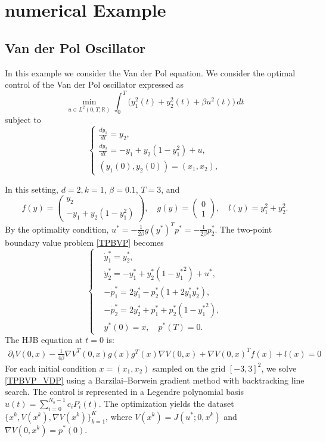 \documentclass[12pt,fleqn]{amsart}
\theoremstyle{definition}
\begin{document}
\section{numerical Example}
\subsection{Van der Pol Oscillator}
In this example we consider the Van der Pol equation. 
We consider the optimal control of the Van der Pol oscillator expressed as
\[
\min_{u \in L^2(0, T; \mathbb{R})} \int_0^T \big( y_1^2(t) + y_2^2(t) + \beta u^2(t) \big) \, dt
\]
subject to
\[
\begin{cases}
\frac{dy_1}{dt} = y_2, \\
\frac{dy_2}{dt} = -y_1 + y_2(1 - y_1^2) + u, \\
(y_1(0), y_2(0)) = (x_1, x_2),
\end{cases}
\]

In this setting, $d = 2, k = 1$, $\beta = 0.1$, $T = 3$, and
\[
	f(y) = \begin{pmatrix} y_2 \\ -y_1 + y_2(1 - y_1^2) \end{pmatrix}, \quad
	g(y) = \begin{pmatrix} 0 \\ 1 \end{pmatrix}, \quad
	l(y) = y_1^2 + y_2^2.
\]
By the optimality condition, $u^* = -\frac{1}{2\beta} g(y^*)^T p^* = -\frac{1}{2\beta} p_2^*$.
The two-point boundary value problem \eqref{TPBVP} becomes
\begin{equation}
\label{TPBVP_VDP}
\left\{
\begin{aligned}
	& \dot{y}_1^* = y_2^*, \\
	& \dot{y}_2^* = -y_1^* + y_2^*(1 - {y_1^*}^2) + u^*, \\
	& -\dot{p}_1^* = 2y_1^* - p_2^*(1 + 2y_1^* y_2^*), \\
	& -\dot{p}_2^* = 2y_2^* + p_1^* + p_2^*(1 - {y_1^*}^2), \\
	& y^*(0) = x, \quad p^*(T) = 0.
\end{aligned}
\right.
\end{equation}
The HJB equation at $t = 0$ is:
\begin{align*}
	\partial_t V(0, x)  -\frac{1}{4\beta} \nabla V^T(0, x) g(x)g^T(x) \nabla V(0,x) + \nabla V(0, x)^T f(x) +  l(x) = 0
\end{align*}
For each initial condition $x = (x_1, x_2)$ sampled on the grid $[-3, 3]^2$, we solve \eqref{TPBVP_VDP} using a Barzilai--Borwein gradient method with backtracking line search.
The control is represented in a Legendre polynomial basis $u(t) = \sum_{i=0}^{N_b - 1} c_i P_i(t)$.
The optimization yields the dataset $\{x^k, V(x^k), \nabla V(x^k)\}_{k=1}^K$, where $V(x^k) = J(u^*; 0, x^k)$ and $\nabla V(0, x^k) = p^*(0)$.
\end{document}
